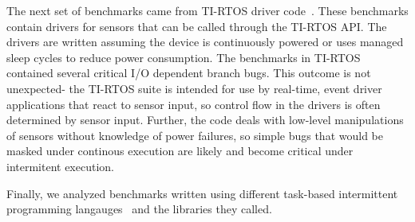 The next set of benchmarks came from TI-RTOS driver code~\cite{tirtos}. These
benchmarks contain drivers for sensors that can be called through the TI-RTOS
API. The drivers are written assuming the device is continuously powered or uses
managed sleep cycles to reduce power consumption.
The benchmarks in TI-RTOS contained several critical I/O dependent branch bugs.
This outcome is not unexpected- the TI-RTOS suite is intended for use by
real-time, event driver applications that react to sensor input, so control flow
in the drivers is often determined by sensor input. Further, the code deals with
low-level manipulations of sensors without knowledge of power failures, so
simple bugs that would be masked under continous execution are likely and become
critical under intermitent execution.

Finally, we analyzed benchmarks written using different task-based intermittent
programming langauges~\cite{alpaca, chain} and the libraries they called.
